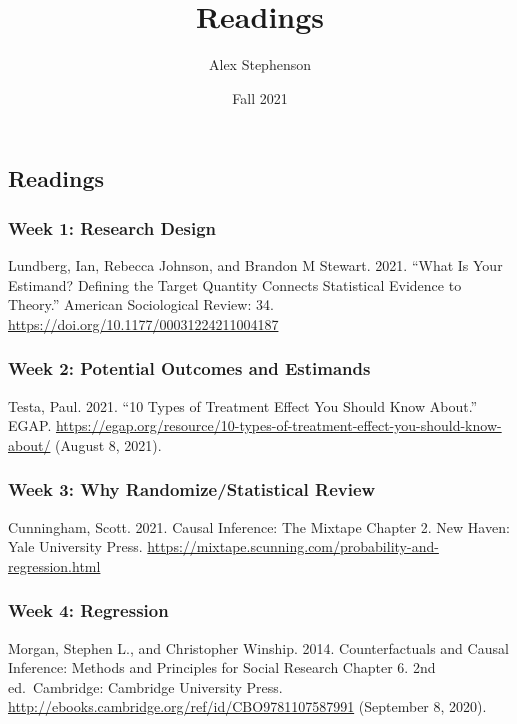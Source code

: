 \documentclass[
  11pt,
]{article}
\title{Readings}
\author{Alex Stephenson}
\date{Fall 2021}
\begin{document}
\maketitle

\hypertarget{readings}{%
\subsection{Readings}\label{readings}}

\hypertarget{week-1-research-design}{%
\subsubsection{Week 1: Research Design}\label{week-1-research-design}}

Lundberg, Ian, Rebecca Johnson, and Brandon M Stewart. 2021. ``What Is
Your Estimand? Defining the Target Quantity Connects Statistical
Evidence to Theory.'' American Sociological Review: 34.
\url{https://doi.org/10.1177/00031224211004187}

\hypertarget{week-2-potential-outcomes-and-estimands}{%
\subsubsection{Week 2: Potential Outcomes and
Estimands}\label{week-2-potential-outcomes-and-estimands}}

Testa, Paul. 2021. ``10 Types of Treatment Effect You Should Know
About.'' EGAP.
\url{https://egap.org/resource/10-types-of-treatment-effect-you-should-know-about/}
(August 8, 2021).

\hypertarget{week-3-why-randomizestatistical-review}{%
\subsubsection{Week 3: Why Randomize/Statistical
Review}\label{week-3-why-randomizestatistical-review}}

Cunningham, Scott. 2021. Causal Inference: The Mixtape Chapter 2. New
Haven: Yale University Press.
\url{https://mixtape.scunning.com/probability-and-regression.html}

\hypertarget{week-4-regression}{%
\subsubsection{Week 4: Regression}\label{week-4-regression}}

Morgan, Stephen L., and Christopher Winship. 2014. Counterfactuals and
Causal Inference: Methods and Principles for Social Research Chapter 6.
2nd ed.~Cambridge: Cambridge University Press.
\url{http://ebooks.cambridge.org/ref/id/CBO9781107587991} (September 8,
2020).
\end{document}
